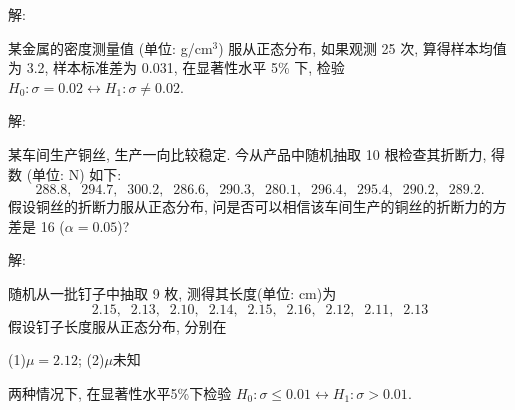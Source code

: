 \documentclass[standard]{ExBook}
\begin{document}
\begin{qitems}
\vspace{-5em}

    \begin{bbox}
解: 
    \end{bbox}

\vspace{-5em}

    \begin{bbox}
    \begin{shaded}
        \qitem
某金属的密度测量值 (单位: g/cm$^3$) 服从正态分布, 如果观测 25 次, 算得样本均值为 3.2, 样本标准差为 0.031, 在显著性水平 5\% 下, 检验 $H_0 : \sigma = 0.02 \longleftrightarrow H_1 : \sigma \neq 0.02$.
    \end{shaded}
    \end{bbox}

\vspace{-5em}

    \begin{bbox}
解: 
    \end{bbox}

\vspace{-5em}

    \begin{bbox}
    \begin{shaded}
        \qitem
某车间生产铜丝, 生产一向比较稳定. 今从产品中随机抽取 10 根检查其折断力, 得数 (单位: N) 如下:
$$288.8, \;\; 294.7, \;\; 300.2, \;\; 286.6, \;\; 290.3, \;\; 280.1, \;\; 296.4, \;\; 295.4, \;\; 290.2, \;\; 289.2.$$
假设铜丝的折断力服从正态分布, 问是否可以相信该车间生产的铜丝的折断力的方差是 16 ($\alpha = 0.05$)?
    \end{shaded}
    \end{bbox}

\vspace{-5em}

    \begin{bbox}
解: 
    \end{bbox}

\vspace{-5em}

    \begin{bbox}
    \begin{shaded}
        \qitem
随机从一批钉子中抽取 9 枚, 测得其长度(单位: cm)为
$$2.15, \;\; 2.13, \;\; 2.10, \;\; 2.14, \;\; 2.15, \;\; 2.16, \;\; 2.12, \;\; 2.11, \;\; 2.13$$
假设钉子长度服从正态分布, 分别在

(1)$\mu=2.12$; \qquad (2)$\mu$未知

两种情况下, 在显著性水平5\%下检验 $H_0 : \sigma\leq 0.01 \longleftrightarrow H_1 : \sigma>0.01$.
    \end{shaded}
    \end{bbox}


\end{qitems}
\end{document}
